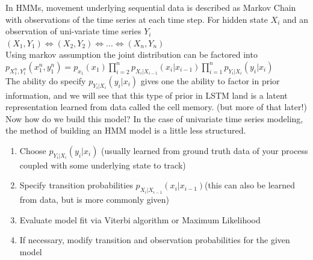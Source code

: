 \documentclass{article}
\begin{document}
\noindent In HMMs, movement underlying sequential data is described as Markov Chain with observations of the time series at each time step. For hidden state $X_i$ and an observation of uni-variate time series $Y_i$\\

\indent$(X_1,Y_1)\Leftrightarrow (X_2,Y_2)\Leftrightarrow...\Leftrightarrow (X_n,Y_n)$ \\

\noindent Using markov assumption the joint distribution can be factored into\\

\indent $p_{X_1^n,Y_1^n}(x_1^n,y_1^n) = p_{x_1}(x_1)\prod_{i=2}^{n}p_{X_i|X_{i-1}}(x_i|x_{i-1})\prod_{i=1}^{n}p_{Y_i|X_{i}}(y_i|x_{i})$\\

\noindent The ability do specify $p_{Y_i|X_{i}}(y_i|x_{i})$ gives one the ability to factor in prior information, and we will see that this type of prior in LSTM land is a latent representation learned from data called the cell memory. (but more of that later!)\\

\noindent Now how do we build this model? In the case of univariate time series modeling, the method of building an HMM model is a little less structured.

\begin{enumerate}
  \item Choose $p_{Y_i|X_{i}}(y_i|x_{i})$ (usually learned from ground truth data of your process coupled with some underlying state to track)
  \item Specify transition probabilities $p_{X_i|X_{i-1}}(x_i|x_{i-1})$(this can also be learned from data, but is more commonly given)
  \item Evaluate model fit via Viterbi algorithm or Maximum Likelihood
  \item If necessary, modify transition and observation probabilities for the given model
\end{enumerate}
\end{document}
